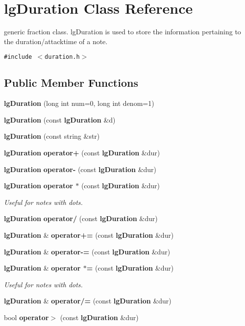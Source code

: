 \section{lg\-Duration Class Reference}
\label{classlgDuration}
generic fraction class. lg\-Duration is used to store the information pertaining to the duration/attacktime of a note.  


{\tt \#include $<$duration.h$>$}

\subsection*{Public Member Functions}
\begin{CompactItemize}
\item 
{\bf lg\-Duration} (long int num=0, long int denom=1)
\item 
{\bf lg\-Duration} (const {\bf lg\-Duration} \&d)
\item 
{\bf lg\-Duration} (const string \&str)
\item 
{\bf lg\-Duration} {\bf operator+} (const {\bf lg\-Duration} \&dur)
\item 
{\bf lg\-Duration} {\bf operator-} (const {\bf lg\-Duration} \&dur)
\item 
{\bf lg\-Duration} {\bf operator $\ast$} (const {\bf lg\-Duration} \&dur)
\begin{CompactList}\small\item\em Useful for notes with dots. \item\end{CompactList}\item 
{\bf lg\-Duration} {\bf operator/} (const {\bf lg\-Duration} \&dur)
\item 
{\bf lg\-Duration} \& {\bf operator+=} (const {\bf lg\-Duration} \&dur)
\item 
{\bf lg\-Duration} \& {\bf operator-=} (const {\bf lg\-Duration} \&dur)
\item 
{\bf lg\-Duration} \& {\bf operator $\ast$=} (const {\bf lg\-Duration} \&dur)
\begin{CompactList}\small\item\em Useful for notes with dots. \item\end{CompactList}\item 
{\bf lg\-Duration} \& {\bf operator/=} (const {\bf lg\-Duration} \&dur)
\item 
bool {\bf operator$>$} (const {\bf lg\-Duration} \&dur)
\item 

\end{CompactItemize}
